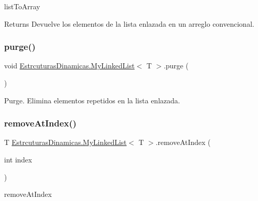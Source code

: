 list\+To\+Array 

\begin{DoxyReturn}{Returns}
Devuelve los elementos de la lista enlazada en un arreglo convencional.
\end{DoxyReturn}
\mbox{\label{class_estrcuturas_dinamicas_1_1_my_linked_list_a7c05c0bb0d58e004735ff7c70a7b42f4}} 
\subsubsection{\texorpdfstring{purge()}{purge()}}
{\footnotesize\ttfamily void \mbox{\hyperlink{class_estrcuturas_dinamicas_1_1_my_linked_list}{Estrcuturas\+Dinamicas.\+My\+Linked\+List}}$<$ T $>$.purge (\begin{DoxyParamCaption}{ }\end{DoxyParamCaption})}



Purge. Elimina elementos repetidos en la lista enlazada. 

\mbox{\label{class_estrcuturas_dinamicas_1_1_my_linked_list_a00228f65c328c48481876460cec259d3}} 
\subsubsection{\texorpdfstring{remove\+At\+Index()}{removeAtIndex()}}
{\footnotesize\ttfamily T \mbox{\hyperlink{class_estrcuturas_dinamicas_1_1_my_linked_list}{Estrcuturas\+Dinamicas.\+My\+Linked\+List}}$<$ T $>$.remove\+At\+Index (\begin{DoxyParamCaption}\item[{int}]{index }\end{DoxyParamCaption})}



remove\+At\+Index 



